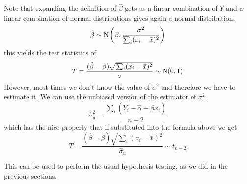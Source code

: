 \documentclass[12pt]{extarticle}
\newcommand{\Normal}{{\operatorfont N}}
\begin{document}
Note that expanding the definition of $\hat \beta$ gets us a linear combination of $Y$
and a linear combination of normal distributions gives again a normal distribution:
\begin{equation}
    \hat \beta \sim \Normal\left(\beta, \frac{\sigma^2}{\sum_i (x_i - \bar x)^2}\right)
\end{equation}
this yields the test statistics of
\begin{equation}
    T = \frac{(\hat \beta - \beta)\sqrt{\sum_i (x_i - \bar x)^2}}{\sigma} \sim \Normal(0, 1)
\end{equation}
However, most times we don't know the value of $\sigma^2$ and therefore we have to estimate it.
We can use the unbiased version of the estimator of $\sigma^2$:
\begin{equation}
    \hat \sigma^2_u = \frac{\sum_i (Y_i - \hat \alpha - \hat \beta x_i)}{n-2}
\end{equation}
which has the nice property that if substituted into the formula above we get
\begin{equation}
    T = \frac{(\hat \beta - \beta)\sqrt{\sum_i (x_i - \bar x)^2}}{\hat \sigma_u} \sim t_{n -2}
\end{equation}

This can be used to perform the usual hypothesis testing, as we did in the previous sections.
\end{document}
